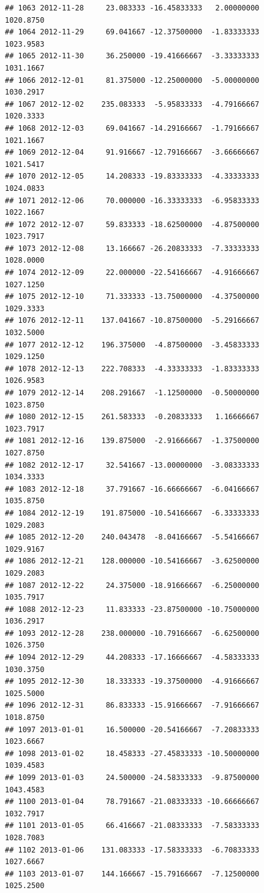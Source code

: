 \documentclass[
]{article}
\begin{document}
\begin{verbatim}
## 1063 2012-11-28     23.083333 -16.45833333   2.00000000    1020.8750
## 1064 2012-11-29     69.041667 -12.37500000  -1.83333333    1023.9583
## 1065 2012-11-30     36.250000 -19.41666667  -3.33333333    1031.1667
## 1066 2012-12-01     81.375000 -12.25000000  -5.00000000    1030.2917
## 1067 2012-12-02    235.083333  -5.95833333  -4.79166667    1020.3333
## 1068 2012-12-03     69.041667 -14.29166667  -1.79166667    1021.1667
## 1069 2012-12-04     91.916667 -12.79166667  -3.66666667    1021.5417
## 1070 2012-12-05     14.208333 -19.83333333  -4.33333333    1024.0833
## 1071 2012-12-06     70.000000 -16.33333333  -6.95833333    1022.1667
## 1072 2012-12-07     59.833333 -18.62500000  -4.87500000    1023.7917
## 1073 2012-12-08     13.166667 -26.20833333  -7.33333333    1028.0000
## 1074 2012-12-09     22.000000 -22.54166667  -4.91666667    1027.1250
## 1075 2012-12-10     71.333333 -13.75000000  -4.37500000    1029.3333
## 1076 2012-12-11    137.041667 -10.87500000  -5.29166667    1032.5000
## 1077 2012-12-12    196.375000  -4.87500000  -3.45833333    1029.1250
## 1078 2012-12-13    222.708333  -4.33333333  -1.83333333    1026.9583
## 1079 2012-12-14    208.291667  -1.12500000  -0.50000000    1023.8750
## 1080 2012-12-15    261.583333  -0.20833333   1.16666667    1023.7917
## 1081 2012-12-16    139.875000  -2.91666667  -1.37500000    1027.8750
## 1082 2012-12-17     32.541667 -13.00000000  -3.08333333    1034.3333
## 1083 2012-12-18     37.791667 -16.66666667  -6.04166667    1035.8750
## 1084 2012-12-19    191.875000 -10.54166667  -6.33333333    1029.2083
## 1085 2012-12-20    240.043478  -8.04166667  -5.54166667    1029.9167
## 1086 2012-12-21    128.000000 -10.54166667  -3.62500000    1029.2083
## 1087 2012-12-22     24.375000 -18.91666667  -6.25000000    1035.7917
## 1088 2012-12-23     11.833333 -23.87500000 -10.75000000    1036.2917
## 1093 2012-12-28    238.000000 -10.79166667  -6.62500000    1026.3750
## 1094 2012-12-29     44.208333 -17.16666667  -4.58333333    1030.3750
## 1095 2012-12-30     18.333333 -19.37500000  -4.91666667    1025.5000
## 1096 2012-12-31     86.833333 -15.91666667  -7.91666667    1018.8750
## 1097 2013-01-01     16.500000 -20.54166667  -7.20833333    1023.6667
## 1098 2013-01-02     18.458333 -27.45833333 -10.50000000    1039.4583
## 1099 2013-01-03     24.500000 -24.58333333  -9.87500000    1043.4583
## 1100 2013-01-04     78.791667 -21.08333333 -10.66666667    1032.7917
## 1101 2013-01-05     66.416667 -21.08333333  -7.58333333    1028.7083
## 1102 2013-01-06    131.083333 -17.58333333  -6.70833333    1027.6667
## 1103 2013-01-07    144.166667 -15.79166667  -7.12500000    1025.2500

\end{verbatim}
\end{document}
